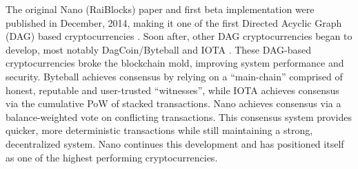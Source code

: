 The original Nano (RaiBlocks) paper and first beta implementation were published in December, 2014, making it one of the first Directed Acyclic Graph (DAG) based cryptocurrencies \cite{Colin_original_Raiblocks}. Soon after, other DAG cryptocurrencies began to develop, most notably DagCoin/Byteball and IOTA \cite{Ribero_dagcoin:a, Popov_tangle:a}. These DAG-based cryptocurrencies broke the blockchain mold, improving system performance and security. Byteball achieves consensus by relying on a ``main-chain'' comprised of honest, reputable and user-trusted ``witnesses'', while IOTA achieves consensus via the cumulative PoW of stacked transactions. Nano achieves consensus via a balance-weighted vote on conflicting transactions. This consensus system provides quicker, more deterministic transactions while still maintaining a strong, decentralized system. Nano continues this development and has positioned itself as one of the highest performing cryptocurrencies.
